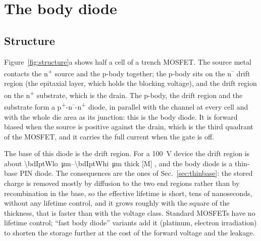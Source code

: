 \documentclass[10pt,a4paper]{scrartcl}
\begin{document}
\section{The body diode}
\label{sec:body}
\subsection{Structure}
Figure~\ref{fig:structure}a shows half a cell of a trench MOSFET. The source metal contacts the n\textsuperscript{+} source and the p-body together; the p-body sits on the n\textsuperscript{--} drift region (the epitaxial layer, which holds the blocking voltage), and the drift region on the n\textsuperscript{+} substrate, which is the drain. The p-body, the drift region and the substrate form a p\textsuperscript{+}-n\textsuperscript{--}-n\textsuperscript{+} diode, in parallel with the channel at every cell and with the whole die area as its junction: this is the body diode. It is forward biased when the source is positive against the drain, which is the third quadrant of the MOSFET, and it carries the full current when the gate is off.

The base of this diode is the drift region. For a \SI{100}{\volt} device the drift region is about \SIrange{\bdIptWlo}{\bdIptWhi}{\micro\metre} thick [M] \cite{baliga}, and the body diode is a thin-base PIN diode. The consequences are the ones of Sec.~\ref{sec:thinbase}: the stored charge is removed mostly by diffusion to the two end regions rather than by recombination in the base, so the effective lifetime is short, tens of nanoseconds, without any lifetime control, and it grows roughly with the square of the thickness, that is faster than with the voltage class. Standard MOSFETs have no lifetime control; ``fast body diode'' variants add it (platinum, electron irradiation) to shorten the storage further at the cost of the forward voltage and the leakage.
\end{document}
